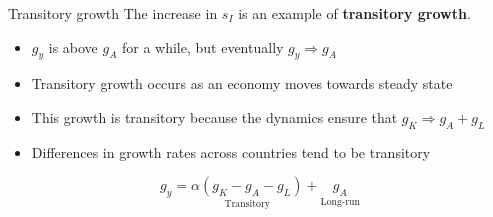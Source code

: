 \begin{frame}{Transitory growth}
The increase in $s_I$ is an example of \textbf{transitory growth}. 
\begin{itemize}
	\item $g_y$ is above $g_A$ for a while, but eventually $g_y \Rightarrow g_A$
	\item Transitory growth occurs as an economy moves towards steady state
	\item This growth is transitory because the dynamics ensure that $g_K \Rightarrow g_A + g_L$
	\item Differences in growth rates across countries tend to be transitory
\end{itemize}
\vspace{.25in}\noindent
\begin{equation}
	g_y = \underset{\text{Transitory}}{\alpha (g_K - g_A - g_L)} + \underset{\text{Long-run}}{g_A} \label{EQ_gy} \nonumber
\end{equation}
\end{frame}


